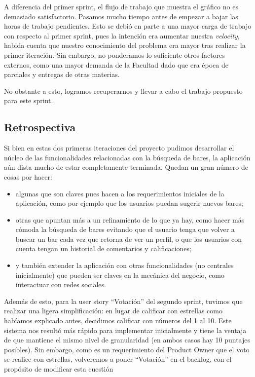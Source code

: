 A diferencia del primer sprint, el flujo de trabajo que muestra el gráfico no es demasiado satisfactorio. Pasamos mucho tiempo antes de empezar a bajar las horas de trabajo pendientes. Esto se debió en parte a una mayor carga de trabajo con respecto al primer sprint, pues la intención era aumentar nuestra \emph{velocity}, habida cuenta que nuestro conocimiento del problema era mayor tras realizar la primer iteración. Sin embargo, no ponderamos lo suficiente otros factores externos, como una mayor demanda de la Facultad dado que era época de parciales y entregas de otras materias.

No obstante a esto, logramos recuperarnos y llevar a cabo el trabajo propuesto para este sprint.

\subsection{Retrospectiva}
\par Si bien en estas dos primeras iteraciones del proyecto pudimos desarrollar el núcleo de las funcionalidades relacionadas con la búsqueda de bares, la aplicación aún dista mucho de estar completamente terminada. Quedan un gran número de cosas por hacer:
\begin{itemize}
 \item algunas que son claves pues hacen a los requerimientos iniciales de la aplicación, como por ejemplo que los usuarios puedan sugerir nuevos bares; 
 \item otras que apuntan más a un refinamiento de lo que ya hay, como hacer más cómoda la búsqueda de bares evitando que el usuario tenga que volver a buscar un bar cada vez que retorna de ver un perfil, o que los usuarios con cuenta tengan un historial de comentarios y calificaciones;
 \item y también extender la aplicación con otras funcionalidades (no centrales inicialmente) que pueden ser claves en la mecánica del negocio, como interactuar con redes sociales.
\end{itemize}

\par Además de esto, para la user story ``Votación'' del segundo sprint, tuvimos que realizar una ligera simplificación: en lugar de calificar con estrellas como habíamos explicado antes, decidimos calificar con números del 1 al 10. Este sistema nos resultó más rápido para implementar inicialmente y tiene la ventaja de que mantiene el mismo nivel de granularidad (en ambos casos hay 10 puntajes posibles). Sin embargo, como es un requerimiento del Product Owner que el voto se realice con estrellas, volveremos a poner ``Votación'' en el backlog, con el propósito de modificar esta cuestión

